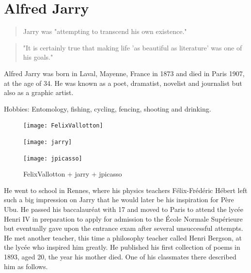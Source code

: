 \section{Alfred Jarry}

\begin{quote}
  Jarry was "attempting to transcend his own existence." \citep{Hugill2012}
\end{quote}

\begin{quote}
  "It is certainly true that making life 'as beautiful as literature' was one of his goals." \citep{Hugill2012}
\end{quote}

Alfred Jarry was born in Laval, Mayenne, France in 1873 and died in Paris 1907, at the age of 34. He was known as a poet, dramatist, novelist and journalist but also as a graphic artist.

Hobbies: Entomology, fishing, cycling, fencing, shooting and drinking.

\begin{figure}[hb]
  \centering
  \begin{minipage}{.275\linewidth}
    \texttt{[image: FelixVallotton]}
  \end{minipage}
  \hspace{.05\linewidth}
  \begin{minipage}{.275\linewidth}
    \texttt{[image: jarry]}
  \end{minipage}
  \hspace{.05\linewidth}
  \begin{minipage}{.275\linewidth}
    \texttt{[image: jpicasso]}
  \end{minipage}
  \caption[figures1-3]{FelixVallotton + jarry + jpicasso}
  \label{img123}
\end{figure}

He went to school in Rennes, where his physics teachers Félix-Frédéric Hébert left such a big impression on Jarry that he would later be his inspiration for Père Ubu. He passed his baccalauréat with 17 and moved to Paris to attend the lycée Henri IV in preparation to apply for admission to the École Normale Supérieure but eventually gave upon the entrance exam after several unsuccessful attempts. He met another teacher, this time a philosophy teacher called Henri Bergson, at the lycée who inspired him greatly. He published his first collection of poems in 1893, aged 20, the year his mother died. One of his classmates there described him as follows.

